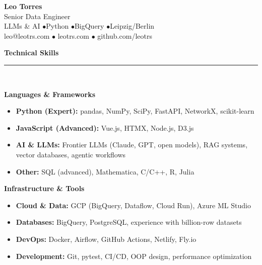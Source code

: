 \documentclass[11pt,a4paper]{article}
\newcommand{\sectiondivider}{%
    \vspace{2pt}\\%
    {\color{verdigris}\rule{30pt}{2pt}}\\%
    \vspace{8pt}%
}
\newcommand{\verdigrisbullet}{{\color{verdigris}$\bullet$}\space}
\newcommand{\cvsectioncustom}[1]{%
    \vspace{12pt}%
    {\Large\color{navy}\textbf{#1}}%
    \sectiondivider%
}
\begin{document}
\color{charcoal}

\begin{center}
    {\Huge\color{navy}\textbf{Leo Torres}}\\[8pt]
    {\large\color{mediumgray}Senior Data Engineer}\\[4pt]
    {LLMs \& AI \verdigrisbullet Python \verdigrisbullet BigQuery \verdigrisbullet Leipzig/Berlin}\\[12pt]
    {\small
        leo@leotrs.com \verdigrisbullet 
        leotrs.com \verdigrisbullet 
        github.com/leotrs
    }\\[8pt]
\end{center}

\vspace{15pt}

\cvsectioncustom{Technical Skills}

\textbf{Languages \& Frameworks}
\begin{itemize}[leftmargin=15pt,itemsep=2pt]
    \item[\verdigrisbullet] \textbf{Python (Expert):} pandas, NumPy, SciPy, FastAPI, NetworkX, scikit-learn
    \item[\verdigrisbullet] \textbf{JavaScript (Advanced):} Vue.js, HTMX, Node.js, D3.js
    \item[\verdigrisbullet] \textbf{AI \& LLMs:} Frontier LLMs (Claude, GPT, open models), RAG systems, vector databases, agentic workflows
    \item[\verdigrisbullet] \textbf{Other:} SQL (advanced), Mathematica, C/C++, R, Julia
\end{itemize}

\vspace{6pt}
\textbf{Infrastructure \& Tools}
\begin{itemize}[leftmargin=15pt,itemsep=2pt]
    \item[\verdigrisbullet] \textbf{Cloud \& Data:} GCP (BigQuery, Dataflow, Cloud Run), Azure ML Studio
    \item[\verdigrisbullet] \textbf{Databases:} BigQuery, PostgreSQL, experience with billion-row datasets
    \item[\verdigrisbullet] \textbf{DevOps:} Docker, Airflow, GitHub Actions, Netlify, Fly.io
    \item[\verdigrisbullet] \textbf{Development:} Git, pytest, CI/CD, OOP design, performance optimization
\end{itemize}
\end{document}
